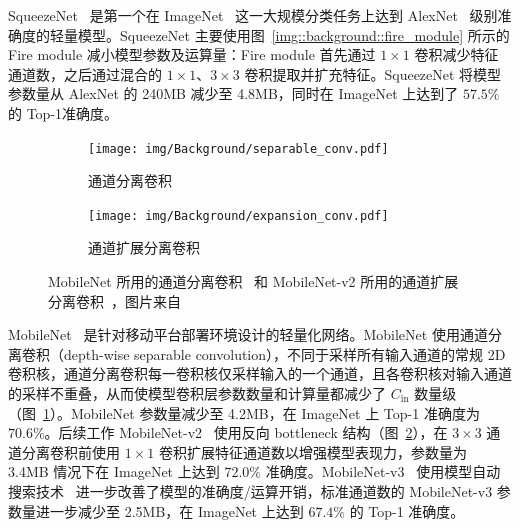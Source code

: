 \documentclass[
  fontset = mac,
]{shtthesis}
\begin{document}
SqueezeNet~\citep{iandola2016squeezenet} 是第一个在 ImageNet~\citep{krizhevsky2012imagenet} 这一大规模分类任务上达到 AlexNet~\citep{krizhevsky2012imagenet} 级别准确度的轻量模型。SqueezeNet 主要使用图~\ref{img::background::fire_module} 所示的 Fire module 减小模型参数及运算量：Fire module 首先通过 $1\times 1$ 卷积减少特征通道数，之后通过混合的 $1\times 1$、$3\times 3$ 卷积提取并扩充特征。SqueezeNet 将模型参数量从 AlexNet 的 240MB 减少至 4.8MB，同时在 ImageNet 上达到了 $57.5\%$ 的 Top-1准确度。

\begin{figure}[htb]
  \centering
  \begin{subfigure}[t]{0.4\columnwidth}
    \centering
    \texttt{[image: img/Background/separable\_conv.pdf]}
    \caption{通道分离卷积}
    \label{img::background::separable_conv}
  \end{subfigure}
  \quad
  \begin{subfigure}[t]{0.5\columnwidth}
    \centering
    \texttt{[image: img/Background/expansion\_conv.pdf]}
    \caption{通道扩展分离卷积}
    \label{img::background::expansion_conv}
  \end{subfigure}
  \caption{MobileNet 所用的通道分离卷积~ 和 MobileNet-v2 所用的通道扩展分离卷积~，图片来自~\citet{Sandler_2018}}
  \label{img::background::mobile_nets}
\end{figure}

MobileNet~\citep{howard2017mobilenets} 是针对移动平台部署环境设计的轻量化网络。MobileNet 使用通道分离卷积（depth-wise separable convolution），不同于采样所有输入通道的常规 2D 卷积核，通道分离卷积每一卷积核仅采样输入的一个通道，且各卷积核对输入通道的采样不重叠，从而使模型卷积层参数数量和计算量都减少了 $C_{\mathrm{in}}$ 数量级（图~\ref{img::background::separable_conv}）。MobileNet 参数量减少至 4.2MB，在 ImageNet 上 Top-1 准确度为 $70.6\%$。后续工作 MobileNet-v2~\citep{Sandler_2018} 使用反向 bottleneck 结构（图~\ref{img::background::expansion_conv}），在 $3\times 3$ 通道分离卷积前使用 $1\times 1$ 卷积扩展特征通道数以增强模型表现力，参数量为 3.4MB 情况下在 ImageNet 上达到 $72.0\%$ 准确度。MobileNet-v3~\citep{howard2019searching} 使用模型自动搜索技术~\citep{zoph2018learning} 进一步改善了模型的准确度/运算开销，标准通道数的 MobileNet-v3 参数量进一步减少至 2.5MB，在 ImageNet 上达到 $67.4\%$ 的 Top-1 准确度。
\end{document}
